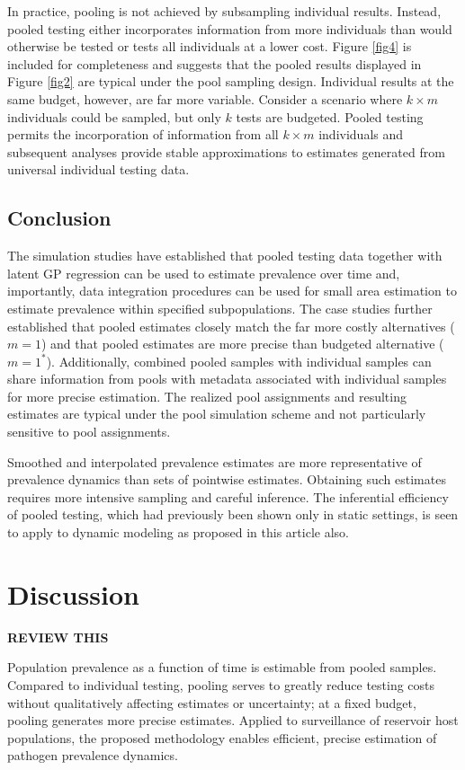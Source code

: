 \documentclass{article}
\begin{document}
In practice, pooling is not achieved by subsampling individual results. Instead, pooled testing either incorporates information from more individuals than would otherwise be tested or tests all individuals at a lower cost. Figure \ref{fig4} is included for completeness and suggests that the pooled results displayed in Figure \ref{fig2} are typical under the pool sampling design. Individual results at the same budget, however, are far more variable. Consider a scenario where $k\times m$ individuals could be sampled, but only $k$ tests are budgeted. Pooled testing permits the incorporation of information from all $k\times m$ individuals and subsequent analyses provide stable approximations to estimates generated from universal individual testing data. 

\subsection{Conclusion}

The simulation studies have established that pooled testing data together with latent GP regression can be used to estimate prevalence over time and, importantly, data integration procedures can be used for small area estimation to estimate prevalence within specified subpopulations. The case studies further established that pooled estimates closely match the far more costly alternatives ($m=1$) and that pooled estimates are more precise than budgeted alternative ($m=1^*$). Additionally, combined pooled samples with individual samples can share information from pools with metadata associated with individual samples for more precise estimation. The realized pool assignments and resulting estimates are typical under the pool simulation scheme and not particularly sensitive to pool assignments.

Smoothed and interpolated prevalence estimates are more representative of prevalence dynamics than sets of pointwise estimates. Obtaining such estimates requires more intensive sampling and careful inference. The inferential efficiency of pooled testing, which had previously been shown only in static settings, is seen to apply to dynamic modeling as proposed in this article also. 

\section{Discussion}

{\bf REVIEW THIS}

Population prevalence as a function of time is estimable from pooled samples. Compared to individual testing, pooling serves to greatly reduce testing costs without qualitatively affecting estimates or uncertainty; at a fixed budget, pooling generates more precise estimates. Applied to surveillance of reservoir host populations, the proposed methodology enables efficient, precise estimation of pathogen prevalence dynamics. 
\end{document}
